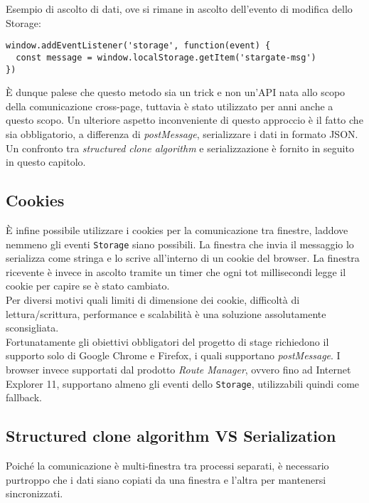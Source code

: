 Esempio di ascolto di dati, ove si rimane in ascolto dell'evento di modifica dello Storage:

\begin{lstlisting}
window.addEventListener('storage', function(event) {
  const message = window.localStorage.getItem('stargate-msg')
})
\end{lstlisting}

È dunque palese che questo metodo sia un trick e non un'API nata allo scopo della comunicazione cross-page, tuttavia è stato utilizzato per anni anche a questo scopo. Un ulteriore aspetto inconveniente di questo approccio è il fatto che sia obbligatorio, a differenza di \textit{postMessage}, serializzare i dati in formato \gls{JSON}. Un confronto tra \textit{structured clone algorithm} e serializzazione è fornito in seguito in questo capitolo.

\subsection{Cookies}

È infine possibile utilizzare i cookies per la comunicazione tra finestre, laddove nemmeno gli eventi \texttt{Storage} siano possibili. La finestra che invia il messaggio lo serializza come stringa e lo scrive all'interno di un cookie del browser. La finestra ricevente è invece in ascolto tramite un timer che ogni tot millisecondi legge il cookie per capire se è stato cambiato. \\

Per diversi motivi quali limiti di dimensione dei cookie, difficoltà di lettura/scrittura, performance e scalabilità è una soluzione assolutamente sconsigliata. \\

Fortunatamente gli obiettivi obbligatori del progetto di stage richiedono il supporto solo di Google Chrome e Firefox, i quali supportano \textit{postMessage}. I browser invece supportati dal prodotto \textit{Route Manager}, ovvero fino ad Internet Explorer 11, supportano almeno gli eventi dello \texttt{Storage}, utilizzabili quindi come fallback.

\subsection{Structured clone algorithm VS Serialization}

Poiché la comunicazione è multi-finestra tra processi separati, è necessario purtroppo che i dati siano copiati da una finestra e l'altra per mantenersi sincronizzati. \\

